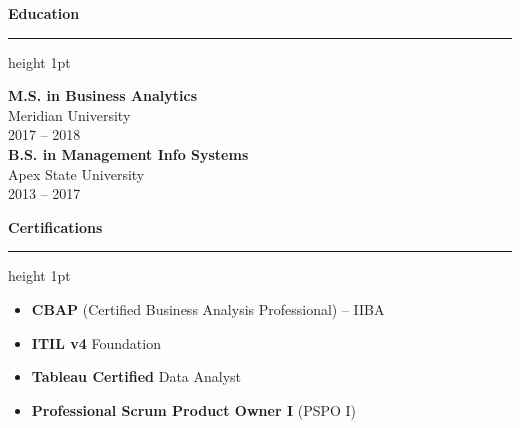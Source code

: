 \documentclass[10pt]{article}
\newcommand{\ressection}[1]{%
  \vspace{0.8em}%
  {\large\bfseries\color{primary} #1}%
  \vspace{0.2em}%
  {\color{accent}\hrule height 1pt}%
  \vspace{0.5em}%
}
\begin{document}
\begin{minipage}[t]{0.34\textwidth}
  \ressection{Education}
  {\bfseries\color{textdark}\small M.S. in Business Analytics} \\
  {\color{secondary}\small Meridian University} \\
  {\color{secondary}\small 2017 -- 2018} \\
  \vspace{0.4em}
  {\bfseries\color{textdark}\small B.S. in Management Info Systems} \\
  {\color{secondary}\small Apex State University} \\
  {\color{secondary}\small 2013 -- 2017}
  
  \ressection{Certifications}
  \begin{itemize}[leftmargin=1.0em, topsep=0pt, itemsep=3pt, parsep=0pt]
    \color{textdark}\small
    \item {\bfseries CBAP} (Certified Business Analysis Professional) -- IIBA
    \item {\bfseries ITIL v4} Foundation
    \item {\bfseries Tableau Certified} Data Analyst
    \item {\bfseries Professional Scrum Product Owner I} (PSPO I)
  \end{itemize}

\end{minipage}
\end{document}
